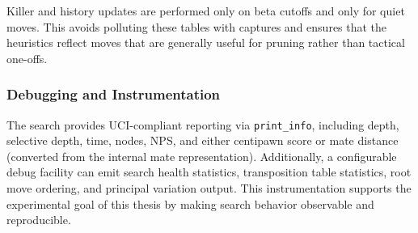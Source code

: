 Killer and history updates are performed only on beta cutoffs and only for quiet
moves. This avoids polluting these tables with captures and ensures that the
heuristics reflect moves that are generally useful for pruning rather than
tactical one-offs.

\subsubsection{Debugging and Instrumentation}

The search provides UCI-compliant reporting via \texttt{print\_info}, including
depth, selective depth, time, nodes, NPS, and either centipawn score or mate
distance (converted from the internal mate representation). Additionally, a
configurable debug facility can emit search health statistics, transposition
table statistics, root move ordering, and principal variation output. This
instrumentation supports the experimental goal of this thesis by making search
behavior observable and reproducible.